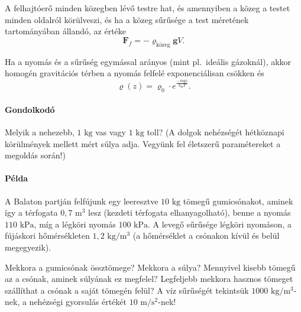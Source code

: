 \documentclass[12pt,a4paper]{scrartcl}
\let\mathbf\bm
\begin{document}
A felhajtóerő minden közegben lévő testre hat, és amennyiben a közeg a testet minden oldalról körülveszi, és ha a közeg sűrűsége a test méretének tartományában állandó, az értéke
\[{{\mathbf{F}}_f} =  - {\varrho _{{\text{közeg}}}}{\mathbf{g}}V.\]

Ha a nyomás és a sűrűség egymással arányos (mint pl.\ ideális gázoknál), akkor homogén gravitációs térben a nyomás felfelé exponenciálisan csökken és
\[\varrho \left( z \right) = {\varrho _0} \cdot {e^{\frac{{ - mgz}}{{{k_B}T}}}}.\]
\footnotesize
\paragraph{Gondolkodó}
Melyik a nehezebb, $1\text{ kg}$ vas vagy $1\text{ kg}$ toll? (A dolgok nehézségét hétköznapi körülmények mellett mért súlya adja. Vegyünk fel életszerű paramétereket a megoldás során!)
\paragraph{Példa}
A Balaton partján felfújunk egy leeresztve $10 \text{ kg}$ tömegű gumicsónakot, aminek így a térfogata $0{,}7\text{ m}^3$ lesz (kezdeti térfogata elhanyagolható), benne a nyomás $110\text{ kPa}$, míg a légköri nyomás $100\text{ kPa}$. A levegő sűrűsége légköri nyomáson, a fújáskori hőmérsékleten $1{,}2\text{ kg}/\text{m}^3$ (a hőmérséklet a csónakon kívül és belül megegyezik).

Mekkora a gumicsónak össztömege? Mekkora a súlya? Mennyivel kisebb tömegű az a csónak, aminek súlyának ez megfelel? Legfeljebb mekkora hasznos tömeget szállíthat a csónak a saját tömegén felül? A víz sűrűségét tekintsük $1000\text{ kg}/\text{m}^3$-nek, a nehézségi gyorsulás értékét $10\text{ m}/\text{s}^2$-nek!
\end{document}
